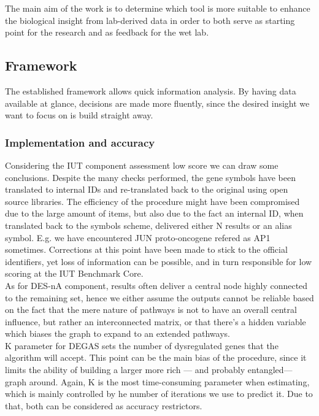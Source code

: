 The main aim of the work is to determine which tool is more suitable to enhance the biological insight from lab-derived data in order to both serve as starting point for the research and as feedback for the wet lab.

\subsection{Framework}
The established framework allows quick information analysis. By having data available at glance, decisions are made more fluently, since the desired insight we want to focus on is build straight away.

\subsubsection{Implementation and accuracy}
Considering the IUT component assessment low score we can draw some conclusions. Despite the many checks performed, the gene symbols have been translated to internal IDs and re-translated back to the original using open source libraries. The efficiency of the procedure might have been compromised due to the large amount of items, but also due to the fact an internal ID, when translated back to the symbols scheme, delivered either N results or an alias symbol. E.g. we have encountered JUN proto-oncogene refered as AP1 sometimes. Corrections at this point have been made to stick to the official identifiers, yet loss of information can be possible, and in turn responsible for low scoring at the IUT Benchmark Core.
\\

As for DES-nA component, results often deliver a central node highly connected to the remaining set, hence we either assume the outputs cannot be reliable based on the fact that the mere nature of pathways is not to have an overall central influence, but rather an interconnected matrix, or that there’s a hidden variable which biases the graph to expand to an extended pathways.
\\

K  parameter for DEGAS sets the number of dysregulated genes that the algorithm will accept. This point can be the main bias of the procedure, since it limits the ability of building a larger more rich — and  probably entangled— graph around. Again, K is the most time-consuming parameter when estimating, which is mainly controlled by he number of iterations we use to predict it. Due to that, both can be considered as accuracy restrictors.
\\

